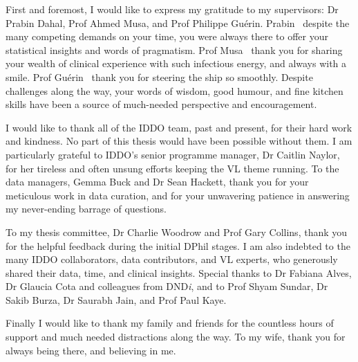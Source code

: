 First and foremost, I would like to express my gratitude to my supervisors: Dr Prabin Dahal, Prof Ahmed Musa, and Prof Philippe Guérin. Prabin \textemdash\ despite the many competing demands on your time, you were always there to offer your statistical insights and words of pragmatism. Prof Musa \textemdash\ thank you for sharing your wealth of clinical experience with such infectious energy, and always with a smile. Prof Guérin \textemdash\ thank you for steering the ship so smoothly. Despite challenges along the way, your words of wisdom, good humour, and fine kitchen skills have been a source of much-needed perspective and encouragement.

I would like to thank all of the IDDO team, past and present, for their hard work and kindness. No part of this thesis would have been possible without them. I am particularly grateful to IDDO's senior programme manager, Dr Caitlin Naylor, for her tireless and often unsung efforts keeping the VL theme running. To the data managers, Gemma Buck and Dr Sean Hackett, thank you for your meticulous work in data curation, and for your unwavering patience in answering my never-ending barrage of questions.

To my thesis committee, Dr Charlie Woodrow and Prof Gary Collins, thank you for the helpful feedback during the initial DPhil stages. I am also indebted to the many IDDO collaborators, data contributors, and VL experts, who generously shared their data, time, and clinical insights. Special thanks to Dr Fabiana Alves, Dr Glaucia Cota and colleagues from DND\textit{i}, and to Prof Shyam Sundar, Dr Sakib Burza, Dr Saurabh Jain, and Prof Paul Kaye.

Finally I would like to thank my family and friends for the countless hours of support and much needed distractions along the way. To my wife, thank you for always being there, and believing in me.